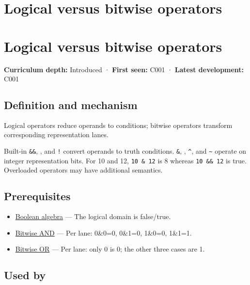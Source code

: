 \hypertarget{appendix-fe6b457d68d8}{}
\section*{Logical versus bitwise operators}
\section{Logical versus bitwise operators}\label{appendix-fe6b457d68d8-logical-versus-bitwise-operators}

\textbf{Curriculum depth:} Introduced · \textbf{First seen:} C001 · \textbf{Latest development:} C001

\subsection{Definition and mechanism}\label{appendix-fe6b457d68d8-definition-and-mechanism}

Logical operators reduce operands to conditions; bitwise operators transform corresponding representation lanes.

Built-in \texttt{\&\&}, \texttt{\textbar{}\textbar{}}, and \texttt{!} convert operands to truth conditions. \texttt{\&}, \texttt{\textbar{}}, \texttt{\^{}}, and \texttt{\textasciitilde{}} operate on integer representation bits. For 10 and 12, \texttt{10\ \&\ 12} is 8 whereas \texttt{10\ \&\&\ 12} is true. Overloaded operators may have additional semantics.

\subsection{Prerequisites}\label{appendix-fe6b457d68d8-prerequisites}

\begin{itemize}
\tightlist
\item
  \hyperref[appendix-24475e1596a8]{Boolean algebra} --- The logical domain is false/true.
\item
  \hyperref[appendix-68b52453737c]{Bitwise AND} --- Per lane: 0\&0=0, 0\&1=0, 1\&0=0, 1\&1=1.
\item
  \hyperref[appendix-a427ce8ce8a6]{Bitwise OR} --- Per lane: only 0 is 0; the other three cases are 1.
\end{itemize}

\subsection{Used by}\label{appendix-fe6b457d68d8-used-by}

